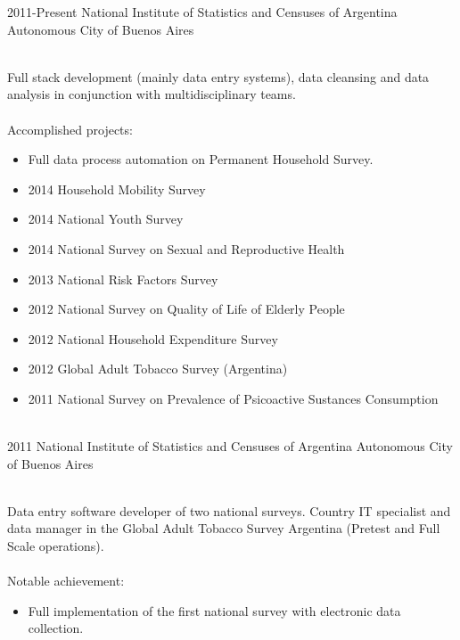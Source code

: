 \documentclass[]{cv-style}          %
\begin{document}
\begin{entrylist}
\entry
  {2011-Present}
  {National Institute of Statistics and Censuses of Argentina}
  {Autonomous City of Buenos Aires}
  {\\
  Full stack development (mainly data entry systems), data cleansing and data analysis in conjunction with multidisciplinary teams.\\\
  \\
  Accomplished projects:
  \begin{itemize}
  	\item Full data process automation on Permanent Household Survey.
  	\item 2014 Household Mobility Survey
    \item 2014 National Youth Survey
    \item 2014 National Survey on Sexual and Reproductive Health
    \item 2013 National Risk Factors Survey
    \item 2012 National Survey on Quality of Life of Elderly People
    \item 2012 National Household Expenditure Survey
    \item 2012 Global Adult Tobacco Survey (Argentina)
    \item 2011 National Survey on Prevalence of Psicoactive Sustances Consumption 
  \end{itemize}
}\\
\entry
  {2011}
  {National Institute of Statistics and Censuses of Argentina}
  {Autonomous City of Buenos Aires}
  {\\
  Data entry software developer of two national surveys. Country IT specialist and data manager in the Global Adult Tobacco Survey Argentina (Pretest and Full Scale operations). \\\
  \\
  Notable achievement:
  \begin{itemize}
    \item Full implementation of the first national survey with electronic data collection.
  \end{itemize}
}\\

\end{entrylist}
\end{document}
